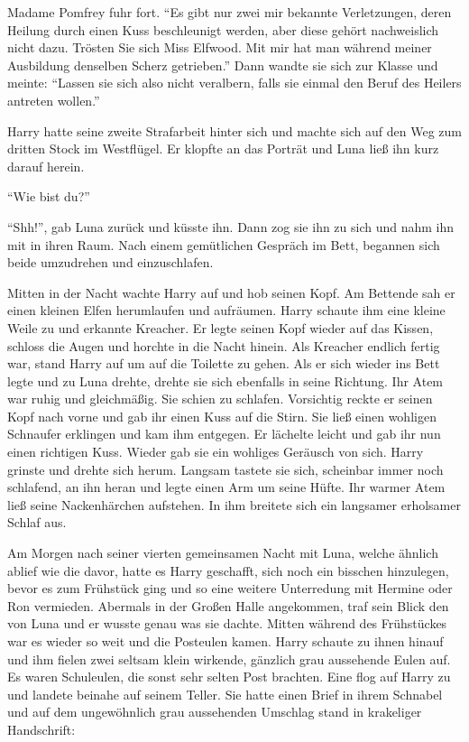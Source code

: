 Madame Pomfrey fuhr fort. \enquote{Es gibt nur zwei mir bekannte Verletzungen, deren Heilung durch einen Kuss beschleunigt werden, aber diese gehört nachweislich nicht dazu. \gst Trösten Sie sich Miss Elfwood. Mit mir hat man während meiner Ausbildung denselben Scherz getrieben.} Dann wandte sie sich zur Klasse und meinte: \enquote{Lassen sie sich also nicht veralbern, falls sie einmal den Beruf des Heilers antreten wollen.}

\trenn

Harry hatte seine zweite Strafarbeit hinter sich und machte sich auf den Weg zum dritten Stock im Westflügel. Er klopfte an das Porträt und Luna ließ ihn kurz darauf herein.

\enquote{Wie bist du\abs?}

\enquote{Shh!}, gab Luna zurück und küsste ihn. Dann zog sie ihn zu sich und nahm ihn mit in ihren Raum. Nach einem gemütlichen Gespräch im  Bett, begannen sich beide umzudrehen und einzuschlafen.

Mitten in der Nacht wachte Harry auf und hob seinen Kopf. Am Bettende sah er einen kleinen Elfen herumlaufen und aufräumen. Harry schaute ihm eine kleine Weile zu und erkannte Kreacher. Er legte seinen Kopf wieder auf das Kissen, schloss die Augen und horchte in die Nacht hinein.  Als Kreacher endlich fertig war, stand Harry auf um auf die Toilette zu gehen. Als er sich wieder ins Bett legte und zu Luna drehte, drehte sie sich ebenfalls in seine Richtung. Ihr Atem war ruhig und gleichmäßig. Sie schien zu schlafen. Vorsichtig reckte er seinen Kopf nach vorne und gab ihr einen Kuss auf die Stirn. Sie ließ einen wohligen Schnaufer erklingen und kam ihm entgegen. Er lächelte leicht und gab ihr nun einen richtigen Kuss. Wieder gab sie ein wohliges Geräusch von sich. Harry grinste und drehte sich herum. Langsam tastete sie sich, scheinbar immer noch schlafend, an ihn heran und legte einen Arm um seine Hüfte. Ihr warmer Atem ließ seine Nackenhärchen aufstehen. In ihm breitete sich ein langsamer erholsamer Schlaf aus.

Am Morgen nach seiner vierten gemeinsamen Nacht mit Luna, welche ähnlich ablief wie die davor, hatte es Harry geschafft, sich noch ein bisschen hinzulegen, bevor es zum Frühstück ging und so eine weitere Unterredung mit Hermine oder Ron vermieden. Abermals in der Großen Halle angekommen, traf sein Blick den von Luna und er wusste genau was sie dachte. Mitten während des Frühstückes war es wieder so weit und die Posteulen kamen. Harry schaute zu ihnen hinauf und ihm fielen zwei seltsam klein wirkende, gänzlich grau aussehende Eulen auf. Es waren Schuleulen, die sonst sehr selten Post brachten. Eine flog auf Harry zu und landete beinahe auf seinem Teller. Sie hatte einen Brief in ihrem Schnabel und auf dem ungewöhnlich grau aussehenden Umschlag stand in krakeliger Handschrift:

